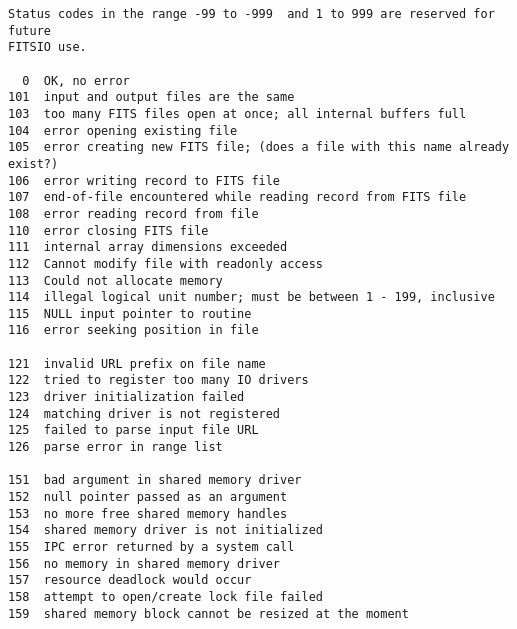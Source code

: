 \documentclass[11pt]{book}
\begin{document}
\begin{verbatim}
Status codes in the range -99 to -999  and 1 to 999 are reserved for future
FITSIO use.

  0  OK, no error
101  input and output files are the same
103  too many FITS files open at once; all internal buffers full
104  error opening existing file
105  error creating new FITS file; (does a file with this name already exist?)
106  error writing record to FITS file
107  end-of-file encountered while reading record from FITS file
108  error reading record from file
110  error closing FITS file
111  internal array dimensions exceeded
112  Cannot modify file with readonly access
113  Could not allocate memory
114  illegal logical unit number; must be between 1 - 199, inclusive
115  NULL input pointer to routine
116  error seeking position in file

121  invalid URL prefix on file name
122  tried to register too many IO drivers
123  driver initialization failed
124  matching driver is not registered
125  failed to parse input file URL
126  parse error in range list

151  bad argument in shared memory driver
152  null pointer passed as an argument
153  no more free shared memory handles
154  shared memory driver is not initialized
155  IPC error returned by a system call
156  no memory in shared memory driver
157  resource deadlock would occur
158  attempt to open/create lock file failed
159  shared memory block cannot be resized at the moment



\end{verbatim}
\end{document}
